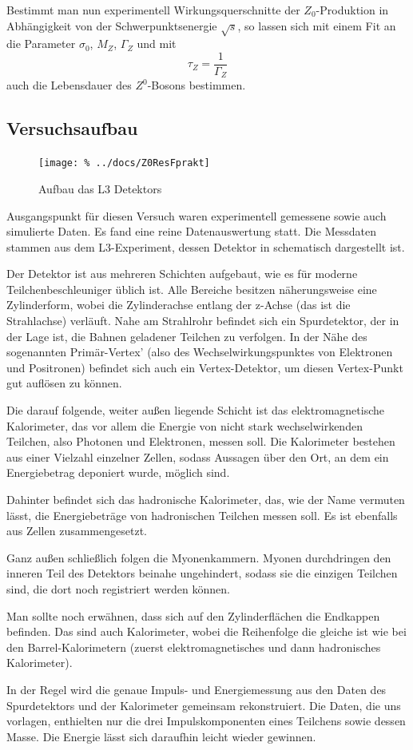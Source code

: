 Bestimmt man nun experimentell Wirkungsquerschnitte der $Z_0$-Produktion in
Abhängigkeit von der Schwerpunktsenergie $\sqrt{s}$, so lassen sich mit einem
Fit an  die Parameter $\sigma_0$, $M_Z$, $\Gamma_Z$ und mit
\begin{equation}
  \tau_Z = \frac{1}{\Gamma_Z}
\end{equation}
auch die Lebensdauer des $Z^0$-Bosons bestimmen.


\subsection{Versuchsaufbau}

\begin{figure}[htb]
 \centering
 \texttt{[image: \%
  ../docs/Z0ResFprakt]}
 \caption{Aufbau das L3 Detektors}
 \label{fig:aufbau_detektor}
\end{figure}

Ausgangspunkt für diesen Versuch waren experimentell gemessene sowie auch
simulierte Daten. Es fand eine reine Datenauswertung statt.
Die Messdaten stammen aus dem L3-Experiment, dessen Detektor in
 schematisch dargestellt ist.

Der Detektor ist aus mehreren Schichten aufgebaut,
wie es für moderne Teilchenbeschleuniger üblich ist. Alle Bereiche besitzen näherungsweise eine Zylinderform, wobei die Zylinderachse entlang der z-Achse (das ist die Strahlachse) verläuft. Nahe am Strahlrohr befindet sich ein Spurdetektor, der in der Lage ist, die Bahnen geladener Teilchen zu verfolgen. In der Nähe des sogenannten Primär-Vertex' (also des Wechselwirkungspunktes von Elektronen und Positronen) befindet sich auch ein Vertex-Detektor, um diesen Vertex-Punkt gut auflösen zu können.

Die darauf folgende, weiter außen liegende Schicht ist das elektromagnetische Kalorimeter, das vor allem die Energie von nicht stark wechselwirkenden Teilchen, also Photonen und Elektronen, messen soll. Die Kalorimeter bestehen aus einer Vielzahl einzelner Zellen, sodass Aussagen über den Ort, an dem ein Energiebetrag deponiert wurde, möglich sind.

Dahinter befindet sich das hadronische Kalorimeter, das, wie der Name vermuten lässt, die Energiebeträge von hadronischen Teilchen messen soll. Es ist ebenfalls aus Zellen zusammengesetzt.

Ganz außen schließlich folgen die Myonenkammern. Myonen durchdringen den inneren Teil des Detektors beinahe ungehindert, sodass sie die einzigen Teilchen sind, die dort noch registriert werden können.

Man sollte noch erwähnen, dass sich auf den Zylinderflächen die Endkappen befinden. Das sind auch Kalorimeter, wobei die Reihenfolge die gleiche ist wie bei den Barrel-Kalorimetern (zuerst elektromagnetisches und dann hadronisches Kalorimeter).

In der Regel wird die genaue Impuls- und Energiemessung aus den Daten des Spurdetektors und der Kalorimeter gemeinsam rekonstruiert. Die Daten, die uns vorlagen, enthielten nur die drei Impulskomponenten eines Teilchens sowie dessen Masse. Die Energie lässt sich daraufhin leicht wieder gewinnen.
